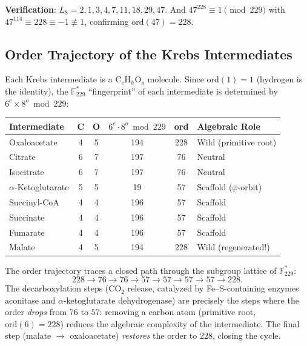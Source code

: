 \documentclass[12pt]{article}
\theoremstyle{principia}
\theoremstyle{definition}
\theoremstyle{remark}
\providecommand{\FF}{\mathbb{F}}
\providecommand{\vpbar}{\bar{\varphi}}
\begin{document}
\noindent\textbf{Verification}: $L_8 = 2, 1, 3, 4, 7, 11, 18, 29, 47$. And $47^{228} \equiv 1 \pmod{229}$ with $47^{114} \equiv 228 \equiv -1 \not\equiv 1$, confirming $\mathrm{ord}(47) = 228$.

\subsection{Order Trajectory of the Krebs Intermediates}

Each Krebs intermediate is a C$_c$H$_h$O$_o$ molecule. Since $\mathrm{ord}(1) = 1$ (hydrogen is the identity), the $\FF_{229}^*$ ``fingerprint'' of each intermediate is determined by $6^c \times 8^o \bmod 229$:

\begin{center}
\begin{tabular}{@{}lcc|cc|l@{}}
\toprule
\textbf{Intermediate} & C & O & $6^c \cdot 8^o \bmod 229$ & \textbf{ord} & \textbf{Algebraic Role} \\
\midrule
Oxaloacetate & 4 & 5 & 194 & 228 & Wild (primitive root) \\
Citrate      & 6 & 7 & 197 & 76  & Neutral \\
Isocitrate   & 6 & 7 & 197 & 76  & Neutral \\
$\alpha$-Ketoglutarate & 5 & 5 & 19 & 57 & Scaffold ($\vpbar$-orbit) \\
Succinyl-CoA & 4 & 4 & 196 & 57  & Scaffold \\
Succinate    & 4 & 4 & 196 & 57  & Scaffold \\
Fumarate     & 4 & 4 & 196 & 57  & Scaffold \\
Malate       & 4 & 5 & 194 & 228 & Wild (regenerated!) \\
\bottomrule
\end{tabular}
\end{center}

\noindent The order trajectory traces a closed path through the subgroup lattice of $\FF_{229}^*$:
\[
228 \to 76 \to 76 \to 57 \to 57 \to 57 \to 57 \to 228.
\]
The decarboxylation steps (CO$_2$ release, catalyzed by Fe--S-containing enzymes aconitase and $\alpha$-ketoglutarate dehydrogenase) are precisely the steps where the order \emph{drops} from $76$ to $57$: removing a carbon atom (primitive root, $\mathrm{ord}(6) = 228$) reduces the algebraic complexity of the intermediate. The final step (malate $\to$ oxaloacetate) \emph{restores} the order to $228$, closing the cycle.
\end{document}
